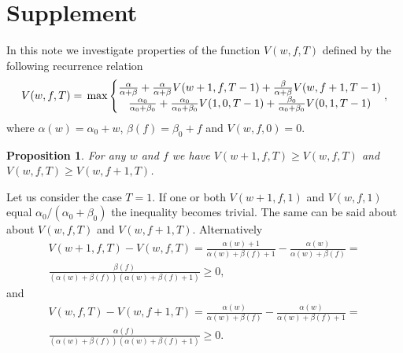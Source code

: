 \documentclass[a4paper,12pt]{article}
\newtheorem{proposition}{Proposition}
\begin{document}
\section{Supplement}
In this note we investigate properties of the function $V(w, f, T)$ defined by the following recurrence relation
\begin{equation}
V(w, f, T) = \\
\max \left\{
\begin{matrix}
	\frac{\alpha}{\alpha + \beta} + \frac{\alpha}{\alpha + \beta} V(w+1, f, T-1) + \frac{\beta}{\alpha + \beta} V(w, f+1, T-1)\\
	\frac{\alpha_0}{\alpha_0 + \beta_0} + \frac{\alpha_0}{\alpha_0 + \beta_0} V(1, 0, T-1) + \frac{\beta_0}{\alpha_0 + \beta_0} V(0, 1, T-1)
\end{matrix}\right.,
\end{equation}
where $\alpha(w) = \alpha_0 + w$, $\beta(f) = \beta_0 + f$ and $V(w, f, 0) = 0$.

\begin{proposition}
For any $w$ and $f$ we have $V(w+1, f, T) \geq V(w, f, T)$ and $V(w, f, T) \geq V(w, f+1, T)$.
\end{proposition}
Let us consider the case $T = 1$. If one or both $V(w+1, f, 1)$ and $V(w, f, 1)$ equal $\alpha_0/(\alpha_0 + \beta_0)$ the inequality becomes trivial. The same can be said about about $V(w, f, T)$ and $V(w, f+1, T)$. Alternatively
\begin{equation}
\begin{split}
V(w+1, f, T) - V(w, f, T) = \frac{\alpha(w) + 1}{\alpha(w) + \beta(f) + 1} - \frac{\alpha(w)}{\alpha(w) + \beta(f)} = \\ \frac{\beta(f)}{(\alpha(w) + \beta(f))(\alpha(w) + \beta(f) + 1)} \geq 0,
\end{split}
\end{equation}
and
\begin{equation}
\begin{split}
V(w, f, T) - V(w, f+1, T) = \frac{\alpha(w)}{\alpha(w) + \beta(f)} - \frac{\alpha(w)}{\alpha(w) + \beta(f)+1} = \\ \frac{\alpha(f)}{(\alpha(w) + \beta(f))(\alpha(w) + \beta(f) + 1)} \geq 0.
\end{split}
\end{equation}
\end{document}
